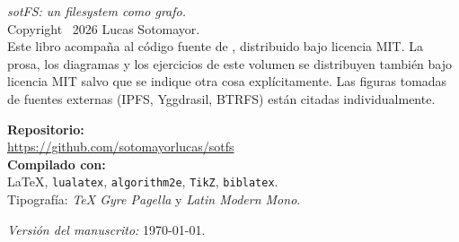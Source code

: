 \thispagestyle{empty}
\null\vfill

\noindent\textit{sotFS: un filesystem como grafo.}\\
Copyright \textcopyright\ 2026 Lucas Sotomayor.\\[6pt]

\noindent
Este libro acompaña al código fuente de , distribuido
bajo licencia MIT. La prosa, los diagramas y los ejercicios de este
volumen se distribuyen también bajo licencia MIT salvo que se indique
otra cosa explícitamente. Las figuras tomadas de fuentes externas
(IPFS, Yggdrasil, BTRFS) están citadas individualmente.

\vspace{1cm}

\noindent\textbf{Repositorio:}\\
\url{https://github.com/sotomayorlucas/sotfs}\\[6pt]

\noindent\textbf{Compilado con:}\\
\LaTeX, \texttt{lualatex}, \texttt{algorithm2e}, \texttt{TikZ}, \texttt{biblatex}.\\
Tipografía: \emph{TeX Gyre Pagella} y \emph{Latin Modern Mono}.

\vspace{1cm}

\noindent\emph{Versión del manuscrito:} \today.

\clearpage
